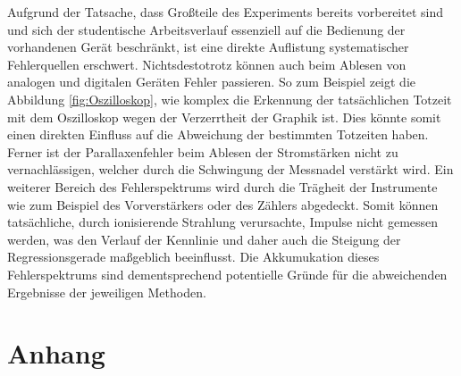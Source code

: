 \noindent Aufgrund der Tatsache, dass Großteile des Experiments bereits vorbereitet sind und sich der studentische Arbeitsverlauf 
essenziell auf die Bedienung der vorhandenen Gerät beschränkt, ist eine direkte Auflistung systematischer Fehlerquellen 
erschwert. Nichtsdestotrotz können auch beim Ablesen von analogen und digitalen Geräten Fehler passieren. So zum Beispiel 
zeigt die Abbildung \ref{fig:Oszilloskop}, wie komplex die Erkennung der tatsächlichen Totzeit mit dem Oszilloskop wegen der 
Verzerrtheit der Graphik ist. Dies könnte somit einen direkten Einfluss auf die Abweichung der bestimmten Totzeiten haben.
Ferner ist der Parallaxenfehler beim Ablesen der Stromstärken nicht zu vernachlässigen, welcher durch die Schwingung der Messnadel
verstärkt wird. Ein weiterer Bereich des Fehlerspektrums wird durch die Trägheit der Instrumente wie zum Beispiel des Vorverstärkers 
oder des Zählers abgedeckt. Somit können tatsächliche, durch ionisierende Strahlung verursachte, Impulse nicht gemessen werden, 
was den Verlauf der Kennlinie und daher auch die Steigung der Regressionsgerade maßgeblich beeinflusst. Die Akkumukation dieses 
Fehlerspektrums sind dementsprechend potentielle Gründe für die abweichenden Ergebnisse der jeweiligen Methoden.   
 
\section{Anhang}

